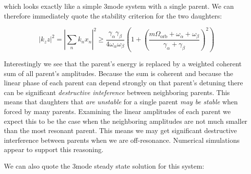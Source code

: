 which looks exactly like a simple 3mode system with a single parent. We can therefore immediately quote the stability criterion for the two daughters:

\begin{equation}
\left|k_z z\right|^2 = \left|\sum\limits_{n}k_n x_n\right|^2 \geq \frac{\gamma_\alpha\gamma_\beta}{4\omega_\alpha\omega_\beta}\left( 1 + \left(\frac{m\Omega_\mathrm{orb} + \omega_\alpha + \omega_\beta}{\gamma_\alpha + \gamma_\beta} \right)^2 \right)
\end{equation}

Interestingly  we see that the parent's energy is replaced by a weighted coherent sum of all parent's amplitudes. Because the sum is coherent  and because the linear phase of each parent can depend strongly on that parent's detuning  there can be significant \emph{destructive inteference} between neighboring parents. This means that daughters that \emph{are unstable} for a single parent \emph{may be stable} when forced by many parents. Examining the linear amplitudes of each parent  we expect this to be the case when the neighboring amplitudes are not much smaller than the most resonant parent. This means we may get significant destructive interference between parents when we are off-resonance. Numerical simulations appear to support this reasoning.

We can also quote the 3mode steady state solution for this system:

